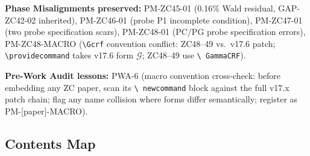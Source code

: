 \documentclass[11pt, a4paper]{article}
\begin{document}
\begin{volumebox}[title={Part G --- CRF Complete Edition v17.9
  (Parts XXXV--XXXVII)}]
\textbf{Phase Misalignments preserved:}
PM-ZC45-01 (0.16\% Wald residual, GAP-ZC42-02 inherited),
PM-ZC46-01 (probe P1 incomplete condition),
PM-ZC47-01 (two probe specification scars),
PM-ZC48-01 (PC/PG probe specification errors),
PM-ZC48-MACRO (\texttt{\textbackslash Gcrf} convention conflict:
ZC48--49 vs.\ v17.6 patch; \texttt{\textbackslash providecommand}
takes v17.6 form $\mathcal{G}$; ZC48--49 use \texttt{\textbackslash
GammaCRF}).

\textbf{Pre-Work Audit lessons:} PWA-6 (macro convention cross-check:
before embedding any ZC paper, scan its \texttt{\textbackslash
newcommand} block against the full v17.x patch chain; flag any
name collision where forms differ semantically; register as
PM-[paper]-MACRO).
\end{volumebox}

\subsection*{Contents Map}
\end{document}
